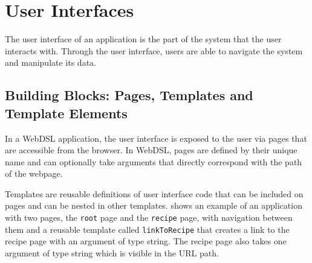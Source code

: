  \section{\label{sec:ui}User Interfaces}

    The user interface of an application is the part of the system that the user interacts with. Through the user interface, users are able to navigate the system and manipulate its data.

    \subsection{\label{subsec:building-blocks}Building Blocks: Pages, Templates and Template Elements}

      In a WebDSL application, the user interface is exposed to the user via pages that are accessible from the browser. In WebDSL, pages are defined by their unique name and can optionally take arguments that directly correspond with the path of the webpage.

      Templates are reusable definitions of user interface code that can be included on pages and can be nested in other templates.  shows an example of an application with two pages, the \texttt{root} page and the \texttt{recipe} page, with navigation between them and a reusable template called \texttt{linkToRecipe} that creates a link to the recipe page with an argument of type string. The recipe page also takes one argument of type string which is visible in the URL path.

